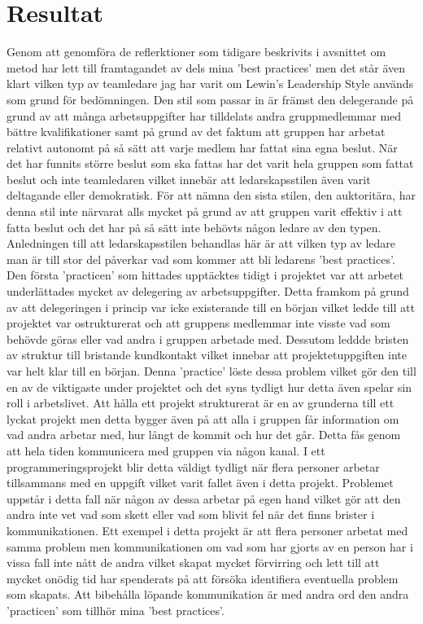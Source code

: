 \section{Resultat}
Genom att genomföra de reflerktioner som tidigare beskrivits i avsnittet om metod har lett till framtagandet av dels mina 'best practices' men det står även klart vilken typ av teamledare jag har varit om Lewin's Leadership Style används som grund för bedömningen. Den stil som passar in är främst den delegerande på grund av att många arbetsuppgifter har tilldelats andra gruppmedlemmar med bättre kvalifikationer samt på grund av det faktum att gruppen har arbetat relativt autonomt på så sätt att varje medlem har fattat sina egna beslut. När det har funnits större beslut som ska fattas har det varit hela gruppen som fattat beslut och inte teamledaren vilket innebär att ledarskapsstilen även varit deltagande eller demokratisk. För att nämna den sista stilen, den auktoritära, har denna stil inte närvarat alls mycket på grund av att gruppen varit effektiv i att fatta beslut och det har på så sätt inte behövts någon ledare av den typen.
\newline \newline
Anledningen till att ledarskapsstilen behandlas här är att vilken typ av ledare man är till stor del påverkar vad som kommer att bli ledarens 'best practices'. Den första 'practicen' som hittades upptäcktes tidigt i projektet var att arbetet underlättades mycket av delegering av arbetsuppgifter. Detta framkom på grund av att delegeringen i princip var icke existerande till en början vilket ledde till att projektet var ostrukturerat och att gruppens medlemmar inte visste vad som behövde göras eller vad andra i gruppen arbetade med. Dessutom leddde bristen av struktur till bristande kundkontakt vilket innebar att projektetuppgiften inte var helt klar till en början. Denna 'practice' löste dessa problem vilket gör den till en av de viktigaste under projektet och det syns tydligt hur detta även spelar sin roll i arbetslivet. 
\newline \newline
Att hålla ett projekt strukturerat är en av grunderna till ett lyckat projekt men detta bygger även på att alla i gruppen får information om vad andra arbetar med, hur långt de kommit och hur det går. Detta fås genom att hela tiden kommunicera med gruppen via någon kanal. I ett programmeringsprojekt blir detta väldigt tydligt när flera personer arbetar tillsammans med en uppgift vilket varit fallet även i detta projekt. Problemet uppstår i detta fall när någon av dessa arbetar på egen hand vilket gör att den andra inte vet vad som skett eller vad som blivit fel när det finns brister i kommunikationen. Ett exempel i detta projekt är att flera personer arbetat med samma problem men kommunikationen om vad som har gjorts av en person har i vissa fall inte nått de andra vilket skapat mycket förvirring och lett till att mycket onödig tid har spenderats på att försöka identifiera eventuella problem som skapats. Att bibehålla löpande kommunikation är med andra ord den andra 'practicen' som tillhör mina 'best practices'.
